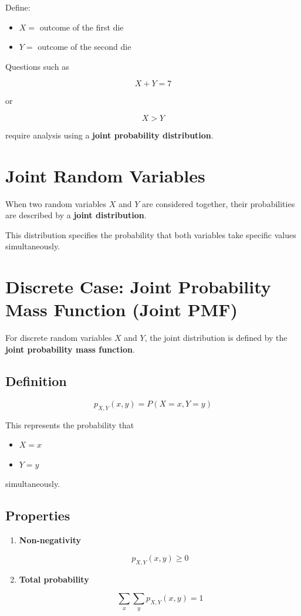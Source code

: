\documentclass[12pt]{article}
\begin{document}
Define:

\begin{itemize}
\item $X =$ outcome of the first die
\item $Y =$ outcome of the second die
\end{itemize}

Questions such as

\[
X + Y = 7
\]

or

\[
X > Y
\]

require analysis using a \textbf{joint probability distribution}.

\section{Joint Random Variables}

When two random variables $X$ and $Y$ are considered together, their probabilities are described by a \textbf{joint distribution}.

This distribution specifies the probability that both variables take specific values simultaneously.

\section{Discrete Case: Joint Probability Mass Function (Joint PMF)}

For discrete random variables $X$ and $Y$, the joint distribution is defined by the \textbf{joint probability mass function}.

\subsection*{Definition}

\[
p_{X,Y}(x,y) = P(X=x, Y=y)
\]

This represents the probability that

\begin{itemize}
\item $X = x$
\item $Y = y$
\end{itemize}

simultaneously.

\subsection*{Properties}

\begin{enumerate}
\item \textbf{Non-negativity}

\[
p_{X,Y}(x,y) \ge 0
\]

\item \textbf{Total probability}

\[
\sum_x \sum_y p_{X,Y}(x,y) = 1
\]

\end{enumerate}
\end{document}
